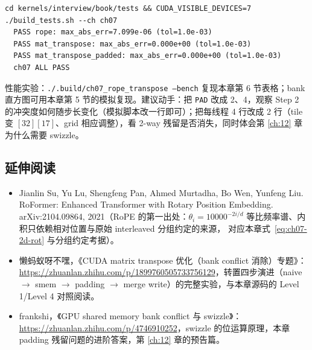 \begin{lstlisting}[style=console]
cd kernels/interview/book/tests && CUDA_VISIBLE_DEVICES=7 ./build_tests.sh --ch ch07
  PASS rope: max_abs_err=7.099e-06 (tol=1.0e-03)
  PASS mat_transpose: max_abs_err=0.000e+00 (tol=1.0e-03)
  PASS mat_transpose_padded: max_abs_err=0.000e+00 (tol=1.0e-03)
  ch07 ALL PASS
\end{lstlisting}

性能实验：\texttt{./\allowbreak{}.build/\allowbreak{}ch07\_\allowbreak{}rope\_\allowbreak{}transpose --bench} 复现本章第 6 节表格；bank 直方图可用本章第 5 节的模拟复现。建议动手：把 \texttt{PAD} 改成 2、4，观察 Step 2 的冲突度如何随步长变化（模拟脚本改一行即可）；把每线程 4 行改成 2 行（tile 变 $[32][17]$、grid 相应调整），看 2-way 残留是否消失，同时体会第 \ref{ch:12} 章为什么需要 swizzle。

\subsection*{延伸阅读}

\begin{itemize}
  \item Jianlin Su, Yu Lu, Shengfeng Pan, Ahmed Murtadha, Bo Wen, Yunfeng
        Liu. RoFormer: Enhanced Transformer with Rotary Position Embedding.
        arXiv:2104.09864, 2021（RoPE 的第一出处：$\theta_i = 10000^{-2i/d}$
        等比频率谱、内积只依赖相对位置与原始 interleaved 分组约定的来源，
        对应本章式~\eqref{eq:ch07-2d-rot} 与分组约定考据）。
  \item 懒蚂蚁呀不嘿，《CUDA matrix transpose 优化（bank conflict 消除）专题》：\url{https://zhuanlan.zhihu.com/p/1899760505733756129}，转置四步演进（naive $\to$ smem $\to$ padding $\to$ merge write）的完整实验，与本章源码的 Level 1/Level 4 对照阅读。
  \item frankshi，《GPU shared memory bank conflict 与 swizzle》：\url{https://zhuanlan.zhihu.com/p/4746910252}，swizzle 的位运算原理，本章 padding 残留问题的进阶答案，第 \ref{ch:12} 章的预告篇。
\end{itemize}
